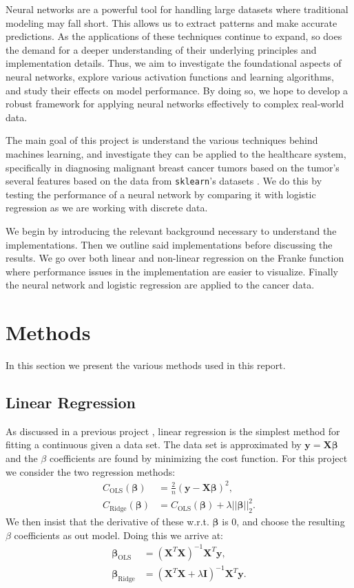 \documentclass[%
reprint,
amsmath,amssymb,
aps,
]{revtex4-2}
\begin{document}
Neural networks are a powerful tool for handling large datasets where traditional modeling may fall short. This allows us to extract patterns and make accurate predictions. As the applications of these techniques continue to expand, so does the demand for a deeper understanding of their underlying principles and implementation details. Thus, we aim to investigate the foundational aspects of neural networks, explore various activation functions and learning algorithms, and study their effects on model performance. By doing so, we hope to develop a robust framework for applying neural networks effectively to complex real-world data.

The main goal of this project is understand the various techniques behind machines learning, and investigate they can be applied to the healthcare system, specifically in diagnosing malignant breast cancer tumors based on the tumor's several features based on the data from \texttt{sklearn}'s datasets \cite{sklearn}. We do this by testing the performance of a neural network by comparing it with logistic regression as we are working with discrete data. 

We begin by introducing the relevant background necessary to understand the implementations. Then we outline said implementations before discussing the results. We go over both linear and non-linear regression on the Franke function where performance issues in the implementation are easier to visualize. Finally the neural network and logistic regression are applied to the cancer data. 

\section{Methods}
In this section we present the various methods used in this report. 

\subsection{Linear Regression}
As discussed in a previous project \cite{project1}, linear regression is the simplest method for fitting a continuous given a data set. The data set is approximated by $\bm y=\bm X\bm\beta$ and the $\beta$ coefficients are found by minimizing the cost function. For this project we consider the two regression methods:
\begin{align}
	C_\text{OLS}(\bm\beta)&=\frac{2}{n}(\bm y-\bm X\bm\beta)^2,\\
	C_\text{Ridge}(\bm\beta)&=C_\text{OLS}(\bm\beta)+\lambda||\bm\beta||_2^2.
\end{align}
We then insist that the derivative of these w.r.t. $\bm\beta$ is $0$, and choose the resulting $\beta$ coefficients as out model. Doing this we arrive at:
\begin{align}
	\bm\beta_\text{OLS}&=(\bm X^T\bm X)^{-1}\bm X^T\bm y,\\
	\bm\beta_\text{Ridge}&=(\bm X^T\bm X+\lambda \bm I)^{-1}\bm X^T\bm y.
\end{align}
\end{document}
